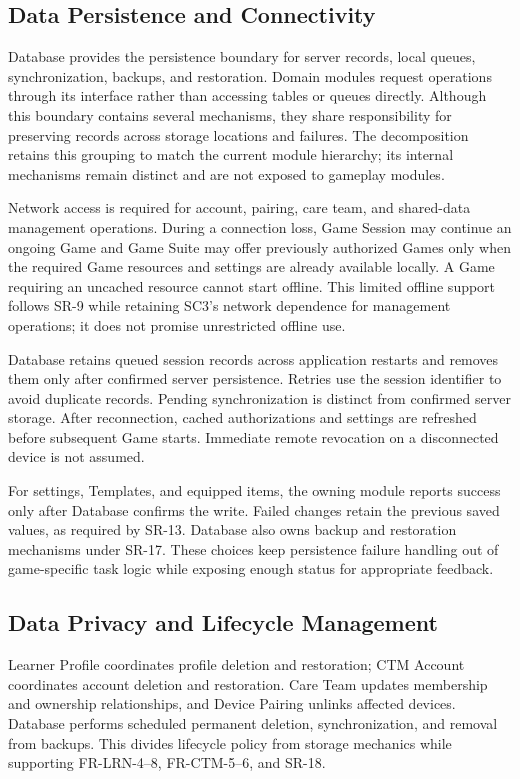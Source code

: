 \documentclass[12pt, titlepage]{article}
\begin{document}
\subsection*{Data Persistence and Connectivity}

Database provides the persistence boundary for server records, local queues,
synchronization, backups, and restoration. Domain modules request operations
through its interface rather than accessing tables or queues directly.
Although this boundary contains several mechanisms, they share responsibility
for preserving records across storage locations and failures. The decomposition
retains this grouping to match the current module hierarchy; its internal
mechanisms remain distinct and are not exposed to gameplay modules.

Network access is required for account, pairing, care team, and shared-data
management operations. During a connection loss, Game Session may continue
an ongoing Game and Game Suite may offer previously authorized Games only
when the required Game resources and settings are already available locally.
A Game requiring an uncached resource cannot start offline. This limited
offline support follows SR-9 while retaining SC3's network dependence for
management operations; it does not promise unrestricted offline use.

Database retains queued session records across application restarts and
removes them only after confirmed server persistence. Retries use the session
identifier to avoid duplicate records. Pending synchronization is distinct
from confirmed server storage. After reconnection, cached authorizations and
settings are refreshed before subsequent Game starts. Immediate remote
revocation on a disconnected device is not assumed.

For settings, Templates, and equipped items, the owning module reports success
only after Database confirms the write. Failed changes retain the previous
saved values, as required by SR-13. Database also owns backup and restoration
mechanisms under SR-17. These choices keep persistence failure handling out
of game-specific task logic while exposing enough status for appropriate
feedback.

\subsection*{Data Privacy and Lifecycle Management}

Learner Profile coordinates profile deletion and restoration; CTM Account
coordinates account deletion and restoration. Care Team updates membership
and ownership relationships, and Device Pairing unlinks affected devices.
Database performs scheduled permanent deletion, synchronization, and removal
from backups. This divides lifecycle policy from storage mechanics while
supporting FR-LRN-4--8, FR-CTM-5--6, and SR-18.
\end{document}
